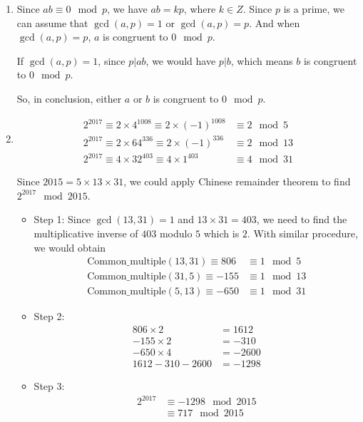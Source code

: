 \documentclass[11pt,a4paper]{article}
\begin{document}
\begin{enumerate}
	\item Since $ab \equiv 0 \mod p$, we have $ab = kp$, where $k \in Z$. Since $p$ is a prime, we can assume that $\gcd(a, p) = 1$ or $\gcd(a, p) = p$. And when $\gcd(a, p) = p$, $a$ is congruent to $0 \mod p$.
	\par If $\gcd(a, p) = 1$, since $p \vert ab$, we would have $p \vert b$, which means $b$ is congruent to $0 \mod p$.
	\par So, in conclusion, either $a$ or $b$ is congruent to $0 \mod p$.

	\item
		\begin{align*}
			2^{2017} \equiv 2 \times 4^{1008} \equiv 2 \times (-1)^{1008} &\equiv 2 \mod 5 \\
			2^{2017} \equiv 2 \times 64^{336} \equiv 2 \times (-1)^{336} &\equiv 2 \mod 13 \\
			2^{2017} \equiv 4 \times 32^{403} \equiv 4 \times 1^{403} &\equiv 4 \mod 31
		\end{align*}
	\par Since $2015 = 5 \times 13 \times 31$, we could apply Chinese remainder theorem to find $2^{2017} \mod 2015$.
		\begin{itemize}
			\item Step 1: Since $\gcd(13, 31) = 1$ and $13 \times 31 = 403$, we need to find the multiplicative inverse of $403$ modulo $5$ which is $2$. With similar procedure, we would obtain
				\begin{align*}
					\mbox{Common\_multiple}(13, 31) \equiv 806 &\equiv 1 \mod 5 \\
					\mbox{Common\_multiple}(31, 5) \equiv -155 &\equiv 1 \mod 13 \\
					\mbox{Common\_multiple}(5, 13) \equiv -650 &\equiv 1 \mod 31
				\end{align*}
			\item Step 2:
				\begin{align*}
					806 \times 2 &= 1612 \\
					-155 \times 2 &= -310 \\
					-650 \times 4 &= -2600 \\
					1612 -310 -2600 &= -1298
				\end{align*}

			\item Step 3:
				\begin{align*}
					2^{2017} &\equiv -1298 \mod 2015 \\
					&\equiv 717 \mod 2015
				\end{align*}
		\end{itemize}

\end{enumerate}
\end{document}
